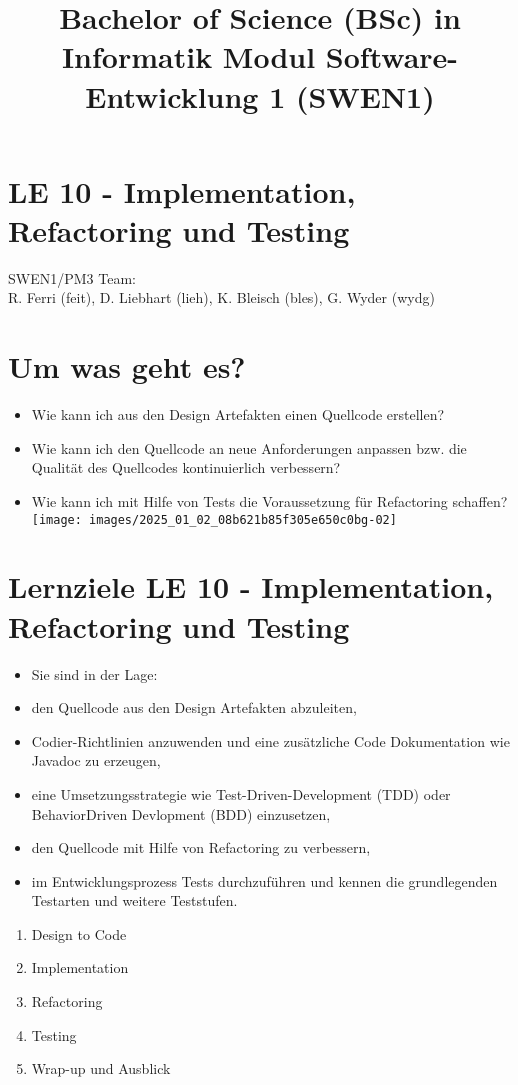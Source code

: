 \documentclass[10pt]{article}
\title{Bachelor of Science (BSc) in Informatik Modul Software-Entwicklung 1 (SWEN1) }
\author{}
\date{}
\begin{document}
\maketitle
\section*{LE 10 - Implementation, Refactoring und Testing}
SWEN1/PM3 Team:\\
R. Ferri (feit), D. Liebhart (lieh), K. Bleisch (bles), G. Wyder (wydg)

\section*{Um was geht es?}
\begin{itemize}
  \item Wie kann ich aus den Design Artefakten einen Quellcode erstellen?
  \item Wie kann ich den Quellcode an neue Anforderungen anpassen bzw. die Qualität des Quellcodes kontinuierlich verbessern?
  \item Wie kann ich mit Hilfe von Tests die Voraussetzung für Refactoring schaffen?\\
\texttt{[image: images/2025\_01\_02\_08b621b85f305e650c0bg-02]}
\end{itemize}

\section*{Lernziele LE 10 - Implementation, Refactoring und Testing}
\begin{itemize}
  \item Sie sind in der Lage:
  \item den Quellcode aus den Design Artefakten abzuleiten,
  \item Codier-Richtlinien anzuwenden und eine zusätzliche Code Dokumentation wie Javadoc zu erzeugen,
  \item eine Umsetzungsstrategie wie Test-Driven-Development (TDD) oder BehaviorDriven Devlopment (BDD) einzusetzen,
  \item den Quellcode mit Hilfe von Refactoring zu verbessern,
  \item im Entwicklungsprozess Tests durchzuführen und kennen die grundlegenden Testarten und weitere Teststufen.
\end{itemize}

\begin{enumerate}
  \item Design to Code
  \item Implementation
  \item Refactoring
  \item Testing
  \item Wrap-up und Ausblick
\end{enumerate}
\end{document}
